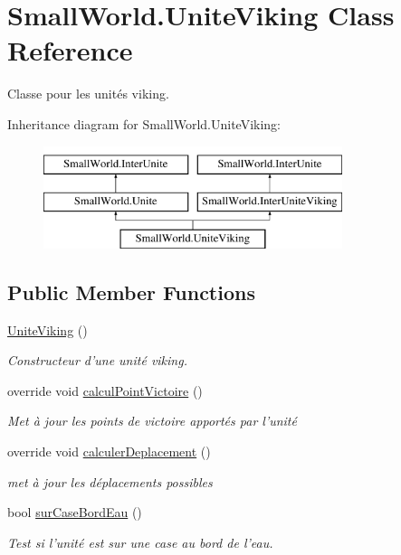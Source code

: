 \hypertarget{class_small_world_1_1_unite_viking}{\section{Small\-World.\-Unite\-Viking Class Reference}
\label{class_small_world_1_1_unite_viking}
}


Classe pour les unités viking.  


Inheritance diagram for Small\-World.\-Unite\-Viking\-:\begin{figure}[H]
\begin{center}
\leavevmode
\includegraphics[height=3.000000cm]{class_small_world_1_1_unite_viking}
\end{center}
\end{figure}
\subsection*{Public Member Functions}
\begin{DoxyCompactItemize}
\item 
\hyperlink{class_small_world_1_1_unite_viking_afb86200ec3c246b81f1fc623ac2935bd}{Unite\-Viking} ()
\begin{DoxyCompactList}\small\item\em Constructeur d'une unité viking. \end{DoxyCompactList}\item 
\hypertarget{class_small_world_1_1_unite_viking_a0421afe507cbe8d0982495f615c946b2}{override void \hyperlink{class_small_world_1_1_unite_viking_a0421afe507cbe8d0982495f615c946b2}{calcul\-Point\-Victoire} ()}\label{class_small_world_1_1_unite_viking_a0421afe507cbe8d0982495f615c946b2}

\begin{DoxyCompactList}\small\item\em Met à jour les points de victoire apportés par l'unité \end{DoxyCompactList}\item 
override void \hyperlink{class_small_world_1_1_unite_viking_a7df92edec9b221dc96be2cf60d19f06f}{calculer\-Deplacement} ()
\begin{DoxyCompactList}\small\item\em met à jour les déplacements possibles \end{DoxyCompactList}\item 
bool \hyperlink{class_small_world_1_1_unite_viking_a90b26b64510e57aa48cae23a82a584eb}{sur\-Case\-Bord\-Eau} ()
\begin{DoxyCompactList}\small\item\em Test si l'unité est sur une case au bord de l'eau. \end{DoxyCompactList}\end{DoxyCompactItemize}

